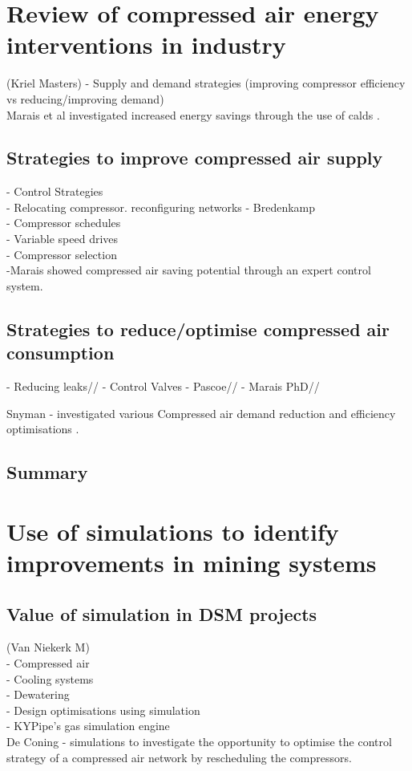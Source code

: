 \section{Review of compressed air energy interventions in industry}
(Kriel Masters)
- Supply and demand strategies (improving compressor efficiency vs reducing/improving demand)\\
Marais et al investigated increased energy savings through the use of \gls{calds} \cite{marais2009increased}.
\subsection{Strategies to improve compressed air supply}
- Control Strategies\\
- Relocating compressor. reconfiguring networks - Bredenkamp\\
- Compressor schedules\\
- Variable speed drives\\
- Compressor selection\\
-Marais showed compressed air saving potential through an expert control system.\cite{marais2010expert}\\
\subsection{Strategies to reduce/optimise compressed air consumption}
- Reducing leaks//
- Control Valves - Pascoe//
- Marais PhD//

Snyman - investigated various Compressed air demand reduction and efficiency optimisations \cite{Snyman2011Masters}.


	\subsection{Summary}
\section{Use of simulations to identify improvements in mining systems}

\subsection{Value of simulation in DSM projects}
(Van Niekerk M)\\
- Compressed air \\
- Cooling systems\\
- Dewatering\\
- Design optimisations using simulation\\
 - KYPipe’s gas simulation engine\\
De Coning -  simulations to investigate the opportunity to optimise the control strategy
of a compressed air network by rescheduling the compressors.
